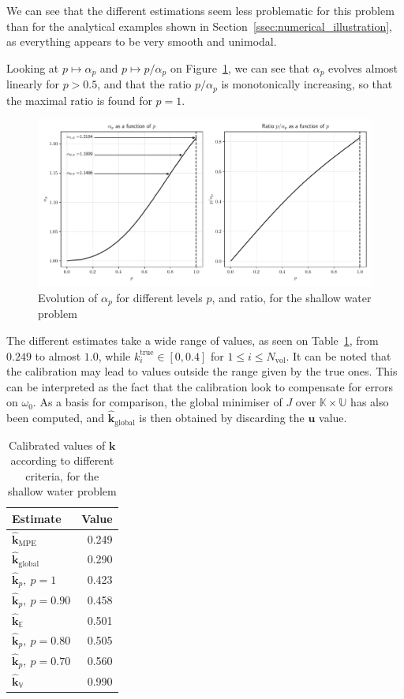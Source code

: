 \documentclass[preprint, 1p]{elsarticle}
\newcommand{\Ex}{\mathbb{E}}
\newcommand{\hatkmean}{\hat{\mathbf{k}}_{\Ex}}
\newcommand{\hatkvar}{\hat{\mathbf{k}}_{\mathbb{V}}}
\newcommand{\hatkmpe}{\hat{\mathbf{k}}_{\mathrm{MPE}}}
\newcommand{\kest}{\hat{\mathbf{k}}}
\newcommand{\hatkp}{\hat{\mathbf{k}}_p}
\newcommand{\Kspace}{\mathbb{K}}
\newcommand{\Uspace}{\mathbb{U}}
\newlength{\onehalfcolumn}
\begin{document}
We can see that the different estimations seem less problematic for this problem than for the analytical examples shown in Section~\ref{ssec:numerical_illustration}, as everything appears to be very smooth and unimodal.

Looking at $p\mapsto \alpha_p$ and $p\mapsto p/\alpha_p$ on Figure~\ref{fig:alpha_p_SWE}, we can see that $\alpha_p$ evolves almost linearly for $p>0.5$, and that the ratio $p/\alpha_p$ is monotonically increasing, so that the maximal ratio is found for $p=1$.  

\begin{figure}[!h]
  \centering
  \includegraphics[width=\onehalfcolumn]{Figures/FIG11}
  \caption{Evolution of $\alpha_p$ for different levels $p$, and ratio, for the shallow water problem}
\label{fig:alpha_p_SWE}
\end{figure}

The different estimates take a wide range of values, as seen on Table~\ref{tab:recap_estimates_metaSWE}, from $0.249$ to almost $1.0$, while $k_i^{\mathrm{true}} \in [0, 0.4]$ for $1\leq i \leq N_{\mathrm{vol}}$. It can be noted that the calibration may lead to values outside the range given by the true ones. This can be interpreted as the fact that the calibration look to compensate for errors on $\omega_0$. 
As a basis for comparison, the global minimiser of $J$ over $\Kspace \times \Uspace$ has also been computed, and $\kest_{\mathrm{global}}$ is then obtained by discarding the $\mathbf{u}$ value.



\begin{table}[!h]
\centering
\caption{Calibrated values of $\mathbf{k}$ according to different criteria, for the shallow water problem}
\begin{tabular}{lr} \toprule
Estimate & Value \\ \midrule
$\hatkmpe$ & 0.249 \\
$\kest_{\mathrm{global}}$ & 0.290 \\
$\hatkp,~p=1$ & 0.423 \\ 
$\hatkp,~p=0.90$ & 0.458 \\ 
$\hatkmean$ & 0.501 \\ 
$\hatkp,~p=0.80$ & 0.505 \\ 
$\hatkp,~p=0.70$ & 0.560 \\ 
$\hatkvar$ & 0.990\\ \bottomrule
\end{tabular}
\label{tab:recap_estimates_metaSWE}
\end{table}
\end{document}
